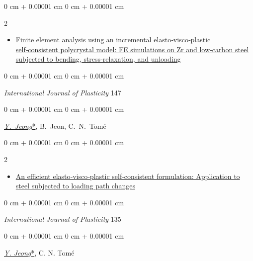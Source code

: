\documentclass[10pt, letterpaper]{article}
\newenvironment{highlights}{
    \begin{itemize}[
        topsep=0.10 cm,
        parsep=0.10 cm,
        partopsep=0pt,
        itemsep=0pt,
        leftmargin=0 cm + 10pt
    ]
}{
    \end{itemize}
} %
\newenvironment{onecolentry}{
    \begin{adjustwidth}{
        0 cm + 0.00001 cm
    }{
        0 cm + 0.00001 cm
    }
}{
    \end{adjustwidth}
} %
\newenvironment{twocolentry}[2][]{
    \onecolentry
    \def\secondColumn{#2}
    \setcolumnwidth{\fill, 4.5 cm}
    \begin{paracol}{2}
}{
    \switchcolumn \raggedleft \secondColumn
    \end{paracol}
    \endonecolentry
} %
\begin{document}
\begin{samepage}
            \begin{twocolentry}{2021}
                \begin{highlights}
                \item\href{https://doi.org/10.1016/j.ijplas.2021.103110}{Finite element analysis using an incremental elasto‑visco‑plastic self‑consistent polycrystal model: FE simulations on Zr and low‑carbon steel subjected to bending, stress‑relaxation, and unloading}
                \end{highlights}
            \end{twocolentry}
            \begin{onecolentry}
                {\it International Journal of Plasticity} 147
            \end{onecolentry}
            \begin{onecolentry}
                \mbox{\underline{\textit{Y. Jeong}*}}, \mbox{B. Jeon}, \mbox{C. N. Tomé}
            \end{onecolentry}
            \vspace{0.10 cm}

            \begin{twocolentry}{2020}
                \begin{highlights}
                \item\href{https://doi.org/10.1016/j.ijplas.2020.102812}{An efficient elasto‑visco‑plastic self‑consistent formulation: Application to steel subjected to loading path changes}
                \end{highlights}
            \end{twocolentry}
            \begin{onecolentry}
                {\it International Journal of Plasticity} 135
            \end{onecolentry}
            \begin{onecolentry}
                {\underline{\textit{Y. Jeong}*}}, C. N. Tomé
            \end{onecolentry}
            \vspace{0.10 cm}
        \end{samepage}
\end{document}
